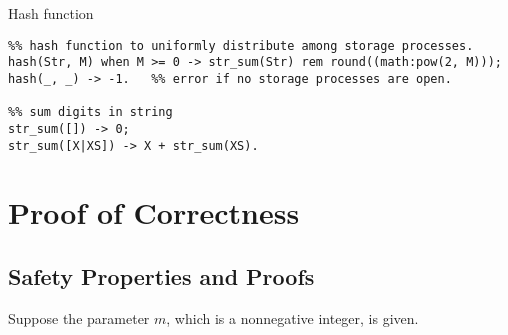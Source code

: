 \documentclass[11pt]{article}
\begin{document}
\begin{algorithm}
  \caption{Hash function}\label{hash}
  \begin{lstlisting}
%% hash function to uniformly distribute among storage processes.
hash(Str, M) when M >= 0 -> str_sum(Str) rem round((math:pow(2, M)));
hash(_, _) -> -1.   %% error if no storage processes are open.
      
%% sum digits in string
str_sum([]) -> 0;
str_sum([X|XS]) -> X + str_sum(XS).
  \end{lstlisting}
\end{algorithm}

\section{Proof of Correctness}


\subsection{Safety Properties and Proofs}
Suppose the parameter $m$, which is a nonnegative integer, is given.
\end{document}
